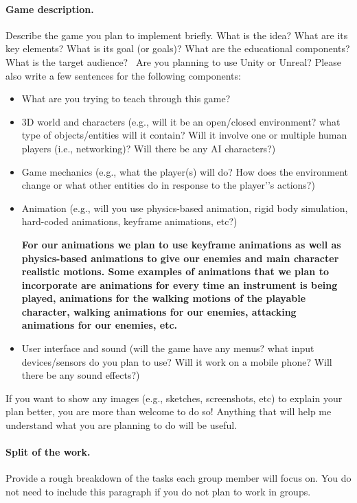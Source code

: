 \documentclass[11pt]{article}
\begin{document}
\maketitle

\paragraph*{Game description.}
Describe the game you plan to implement briefly. What is the idea? What are its key elements? What is its goal (or goals)? What are the educational components? What is the target audience?  \ Are you planning to use Unity or Unreal? Please also write a few sentences  for the following components:


\begin{itemize}
\item What are you trying to teach through this game?

\item 3D world and characters (e.g., will it be an open/closed environment? what type of objects/entities will it contain? Will it involve one or multiple human players (i.e., networking)? Will there be any AI characters?)

\item Game mechanics (e.g., what the player(s) will do? How does the environment change or what other entities do in response to the player’'s actions?)

\item Animation (e.g., will you use physics-based animation, rigid body simulation, hard-coded animations, keyframe animations, etc?)

\textbf{For our animations we plan to use keyframe animations as well as physics-based animations to give our enemies and main character realistic motions. Some examples of animations that we plan to incorporate are animations for every time an instrument is being played, animations for the walking motions of the playable character, walking animations for our enemies, attacking animations for our enemies, etc. }
\item User interface and sound (will the game have any menus? what input devices/sensors do you plan to use? Will it work on a mobile phone? Will there be any sound effects?)
\end{itemize}

If you want to show any images (e.g., sketches, screenshots, etc) to explain your plan better, you are more than welcome to do so! Anything that will help me understand what you are planning to do will be useful.  


\paragraph{Split of the work.}
Provide  a rough breakdown of the tasks each group member will focus on. You do not need to include this paragraph if you do not plan to work in groups. 
\end{document}
